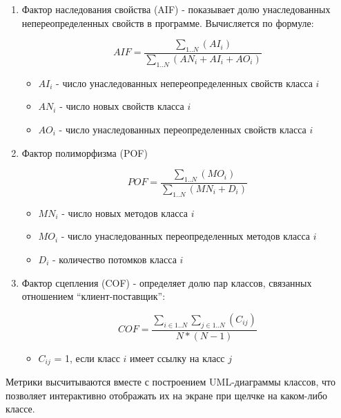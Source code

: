 \begin{enumerate}
    \item Фактор наследования свойства (AIF) - показывает долю унаследованных
    непереопределенных свойств в программе. Вычисляется по формуле:

    \begin{equation}
        AIF = \frac{\sum_{1..N}(AI_i)}{\sum_{1..N}(AN_i + AI_i + AO_i)}
    \end{equation}

    \begin{itemize}
        \item $AI_i$ - число унаследованных непереопределенных свойств класса $i$
        \item $AN_i$ - число новых свойств класса $i$
        \item $AO_i$ - число унаследованных переопределенных свойств класса $i$
    \end{itemize}

    \item Фактор полиморфизма (POF)

    \begin{equation}
        POF = \frac{\sum_{1..N}(MO_i)}{\sum_{1..N}(MN_i + D_i)}
    \end{equation}

    \begin{itemize}
        \item $MN_i$ - число новых методов класса $i$
        \item $MO_i$ - число унаследованных переопределенных методов класса $i$
        \item $D_i$ - количество потомков класса $i$
    \end{itemize}

    \item Фактор сцепления (COF) - определяет долю пар классов, связанных
    отношением ``клиент-поставщик'':

    \begin{equation}
        COF = \frac{\sum_{i \in 1..N}\sum_{j \in 1..N}(C_{ij})}{N * (N - 1)}
    \end{equation}

    \begin{itemize}
        \item $C_{ij}$ = 1, если класс $i$ имеет ссылку на класс $j$
    \end{itemize}
\end{enumerate}

Метрики высчитываются вместе с построением UML-диаграммы классов, что позволяет
интерактивно отображать их на экране при щелчке на каком-либо классе.

